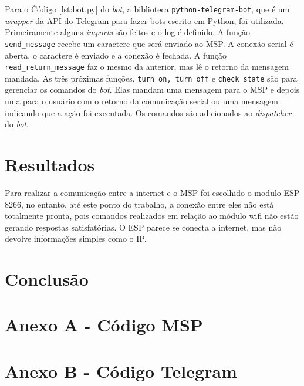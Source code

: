\documentclass[12pt,journal,compsoc]{IEEEtran}
\begin{document}
Para o Ćódigo \ref{lst:bot.py} do \textit{bot}, a biblioteca \texttt{python-telegram-bot}, que é um \textit{wrapper} da API do Telegram para fazer bots escrito em Python, foi utilizada. Primeiramente alguns \textit{imports} são feitos e o log é definido. A função \texttt{send\_message} recebe um caractere que será enviado ao MSP. A conexão serial é aberta, o caractere é enviado e a conexão é fechada. A função \texttt{read\_return\_message} faz o mesmo da anterior, mas lê o retorno da mensagem mandada. As três próximas funções, \texttt{turn\_on, turn\_off} e \texttt{check\_state} são para gerenciar os comandos do \textit{bot}. Elas mandam uma mensagem para o MSP e depois uma para o usuário com o retorno da comunicação serial ou uma mensagem indicando que a ação foi executada. Os comandos são adicionados ao \textit{dispatcher} do \textit{bot}.


\section{Resultados}

Para realizar a comunicação entre a internet e o MSP foi escolhido o modulo ESP 8266, no entanto, até este ponto do trabalho, a conexão entre eles não está totalmente pronta, pois comandos realizados em relação ao módulo wifi não estão gerando respostas satisfatórias. O ESP parece se conecta a internet, mas não devolve informações simples como o IP.


\section{Conclusão}

\section*{Anexo A - Código MSP}



\section*{Anexo B - Código Telegram}





\end{document}
